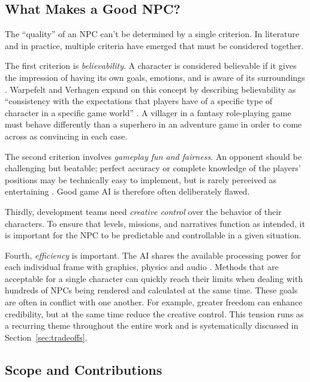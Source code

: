 \subsection{What Makes a Good NPC?}

The ``quality'' of an NPC can't be determined by a single criterion. 
In literature and in practice, multiple criteria have emerged that must be considered together.

The first criterion is \emph{believability}. A character is considered believable if it gives the impression of having its own goals, emotions, and is aware of its surroundings \cite{bates1994,loyall1997}. Warpefelt and Verhagen expand on this concept by describing believability as ``consistency with the expectations that players have of a specific type of character in a specific game world'' \cite{warpefelt2017}. A villager in a fantasy role-playing game must behave differently than a superhero in an adventure game in order to come across as convincing in each case. 

The second criterion involves \emph{gameplay fun and fairness}. An opponent should be challenging but beatable; perfect accuracy or complete knowledge of the players' positions may be technically easy to implement, but is rarely perceived as entertaining \cite{sweetser2005}. Good game AI is therefore often deliberately flawed.

Thirdly, development teams need \emph{creative control} over the behavior of their characters. To ensure that levels, missions, and narratives function as intended, it is important for the NPC to be predictable and controllable in a given situation.

Fourth, \emph{efficiency} is important. The AI shares the available processing power for each individual frame with graphics, physics and audio \cite{nareyek2004}. Methods that are acceptable for a single character can quickly reach their limits when dealing with hundreds of NPCs being rendered and calculated at the same time.
These goals are often in conflict with one another. For example, greater freedom can enhance credibility, but at the same time reduce the creative control. This tension runs as a recurring theme throughout the entire work and is systematically discussed in Section~\ref{sec:tradeoffs}.

\subsection{Scope and Contributions}

